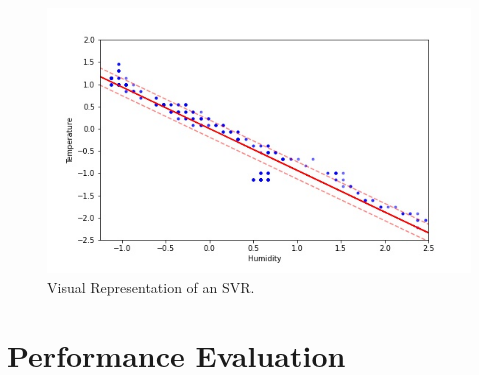 \documentclass{mpaper}
\begin{document}
\setcounter{figure}{0} 
\setcounter{table}{0}

\begin{figure}[h]
\centering
\includegraphics[scale=0.4]{SVR_representation.jpg}
\caption{\label{fig-SVRex}Visual Representation of an SVR.}
\end{figure}



\section{Performance Evaluation}\label{apx:performance_evaluation}
\setcounter{figure}{0} 
\setcounter{table}{0}
\end{document}
